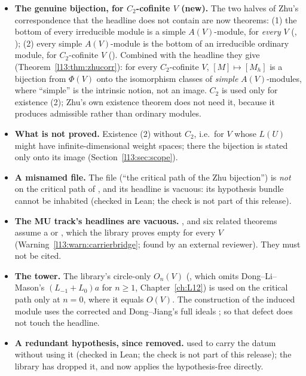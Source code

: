 \begin{itemize}
\item \textbf{The genuine bijection, for $C_2$-cofinite $V$ (new).} The two halves of Zhu's correspondence that the
  headline does not contain are now theorems: (1) the bottom of every irreducible module is a simple $A(V)$-module, for
  \emph{every} $V$ (, ); (2) every simple $A(V)$-module is
  the bottom of an irreducible ordinary module, for $C_2$-cofinite $V$ (). Combined
  with the headline they give  (Theorem~\ref{l13:thm:zhucorr}): for every $C_2$-cofinite
  $V$, $[M]\mapsto[M_h]$ is a bijection from $\Phi(V)$ onto the isomorphism classes of \emph{simple} $A(V)$-modules, where
  ``simple'' is the intrinsic notion, not an image. $C_2$ is used only for existence (2); Zhu's own existence theorem does
  not need it, because it produces admissible rather than ordinary modules.
\item \textbf{What is not proved.} Existence (2) without $C_2$, i.e.\ for $V$ whose $L(U)$ might have infinite-dimensional
  weight spaces; there the bijection is stated only onto its image (Section~\ref{l13:sec:scope}).
\item \textbf{A misnamed file.} The file 
  (``the critical path of the Zhu bijection'') is \emph{not} on the critical path of , and its
  headline  is vacuous: its hypothesis bundle cannot be inhabited (checked in Lean; the check is
  not part of this release).
\item \textbf{The MU track's headlines are vacuous.} ,  and six
  related theorems assume a  or , which the library proves empty for every $V$
  (Warning~\ref{l13:warn:carrierbridge}; found by an external reviewer). They must not be cited.
\item \textbf{The tower.} The library's circle-only $O_n(V)$ (, which omits Dong--Li--Mason's
  $(L_{-1}+L_0)a$ for $n\ge1$, Chapter~\ref{ch:L12}) is used on the critical path only at $n = 0$, where it equals
  $O(V)$. The construction of the induced module uses the corrected  and Dong--Jiang's full ideals
  ; so that defect does not touch the headline.
\item \textbf{A redundant hypothesis, since removed.}  used to carry the datum  without using it
  (checked in Lean; the check is not part of this release); the library has dropped it, and  now applies the hypothesis-free  directly.
\end{itemize}


